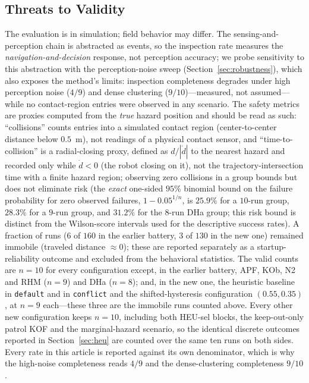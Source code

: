 \subsection{Threats to Validity}
\label{sec:threats}
The evaluation is in simulation; field behavior may differ. The
sensing-and-perception chain is abstracted as events, so the inspection rate
measures the \emph{navigation-and-decision} response, not perception accuracy;
we probe sensitivity to this abstraction with the perception-noise sweep
(Section~\ref{sec:robustness}), which also exposes the method's limits: inspection
completeness degrades under high perception noise ($4/9$) and dense clustering
($9/10$)---measured, not assumed---while no contact-region entries were observed in
any scenario. The safety metrics are
proxies computed from the \emph{true} hazard position and should be read as such:
``collisions'' counts entries into a simulated contact region (center-to-center
distance below $0.5$~m), not readings of a physical contact sensor, and
``time-to-collision'' is a radial-closing proxy, defined as $d/|\dot d|$ to the
nearest hazard and recorded only while $\dot d<0$ (the robot closing on it),
not the trajectory-intersection time with a finite hazard region; observing zero
collisions in a group bounds but does not eliminate risk (the \emph{exact} one-sided $95\%$
binomial bound on the failure probability for zero observed failures,
$1-0.05^{1/n}$, is $25.9\%$ for a $10$-run group, $28.3\%$ for a
$9$-run group, and $31.2\%$ for the $8$-run DHa group; this risk bound is
distinct from the Wilson-score intervals used for the descriptive success rates).
A fraction of runs ($6$ of $160$ in the earlier battery, $3$ of $130$ in the new
one) remained immobile (traveled distance $\approx0$); these are reported
separately as a startup-reliability outcome and excluded from the behavioral
statistics. %
The valid counts are $n=10$ for every configuration except, in the earlier battery,
APF, KOb, N2 and RHM ($n=9$) and DHa ($n=8$); and, in the new one, the heuristic
baseline in \texttt{default} and in \texttt{conflict} and the shifted-hysteresis
configuration $(0.55,0.35)$, at $n=9$ each---these three are the immobile runs
counted above. Every other new configuration keeps $n=10$, including both
HEU-sel blocks, the keep-out-only patrol KOF and the
marginal-hazard scenario, so the identical discrete outcomes reported in
Section~\ref{sec:heu} are counted over the same ten runs on both sides. Every rate
in this article is reported against its own denominator, which is why the high-noise
completeness reads $4/9$ and the dense-clustering completeness $9/10$.

